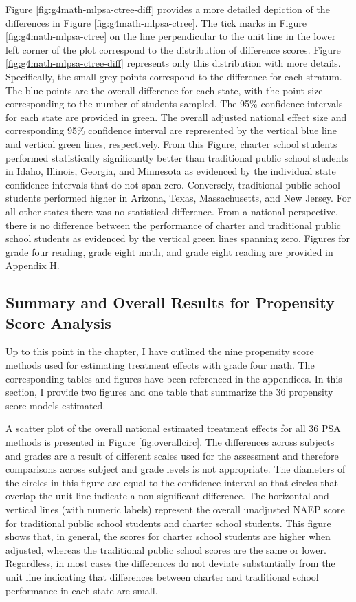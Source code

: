 \documentclass[letterpaper,12pt]{article} %
\begin{document}
Figure \ref{fig:g4math-mlpsa-ctree-diff} provides a more detailed depiction of the differences in Figure \ref{fig:g4math-mlpsa-ctree}. The tick marks in Figure \ref{fig:g4math-mlpsa-ctree} on the line perpendicular to the unit line in the lower left corner of the plot correspond to the distribution of difference scores. Figure \ref{fig:g4math-mlpsa-ctree-diff} represents only this distribution with more details. Specifically, the small grey points correspond to the difference for each stratum. The blue points are the overall difference for each state, with the point size corresponding to the number of students sampled. The 95\% confidence intervals for each state are provided in green. The overall adjusted national effect size and corresponding 95\% confidence interval are represented by the vertical blue line and vertical green lines, respectively. From this Figure, charter school students performed statistically significantly better than traditional public school students in Idaho, Illinois, Georgia, and Minnesota as evidenced by the individual state confidence intervals that do not span zero. Conversely, traditional public school students performed higher in Arizona, Texas, Massachusetts, and New Jersey. For all other states there was no statistical difference. From a national perspective, there is no difference between the performance of charter and traditional public school students as evidenced by the vertical green lines spanning zero. Figures for grade four reading, grade eight math, and grade eight reading are provided in \hyperref[appendixH]{Appendix H}.


\subsection{Summary and Overall Results for Propensity Score Analysis}

Up to this point in the chapter, I have outlined the nine propensity score methods used for estimating treatment effects with grade four math. The corresponding tables and figures have been referenced in the appendices. In this section, I provide two figures and one table that summarize the 36 propensity score models estimated.

A scatter plot of the overall national estimated treatment effects for all 36 PSA methods is presented in Figure \ref{fig:overallcirc}. The differences across subjects and grades are a result of different scales used for the assessment and therefore comparisons across subject and grade levels is not appropriate. The diameters of the circles in this figure are equal to the confidence interval so that circles that overlap the unit line indicate a non-significant difference. The horizontal and vertical lines (with numeric labels) represent the overall unadjusted NAEP score for traditional public school students and charter school students. This figure shows that, in general, the scores for charter school students are higher when adjusted, whereas the traditional public school scores are the same or lower. Regardless, in most cases the differences do not deviate substantially from the unit line indicating that differences between charter and traditional school performance in each state are small.
\end{document}
